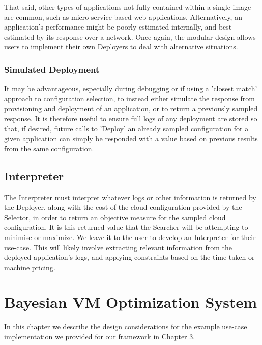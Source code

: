 \documentclass{report}
\begin{document}
That said, other types of applications not fully contained within a single image are common, such as micro-service based web applications. Alternatively, an application's performance might be poorly estimated internally, and best estimated by its response over a network. Once again, the modular design allows users to implement their own Deployers to deal with alternative situations.

\subsection{Simulated Deployment}
It may be advantageous, especially during debugging or if using a 'closest match' approach to configuration selection, to instead either simulate the response from provisioning and deployment of an application, or to return a previously sampled response. It is therefore useful to ensure full logs of any deployment are stored so that, if desired, future calls to 'Deploy' an already sampled configuration for a given application can simply be responded with a value based on previous results from the same configuration.

\section{Interpreter}
The Interpreter must interpret whatever logs or other information is returned by the Deployer, along with the cost of the cloud configuration provided by the Selector, in order to return an objective measure for the sampled cloud configuration. It is this returned value that the Searcher will be attempting to minimise or maximize. We leave it to the user to develop an Interpreter for their use-case. This will likely involve extracting relevant information from the deployed application's logs, and applying constraints based on the time taken or machine pricing. 

\chapter{Bayesian VM Optimization System}
In this chapter we describe the design considerations for the example use-case implementation we provided for our framework in Chapter 3.
\end{document}
